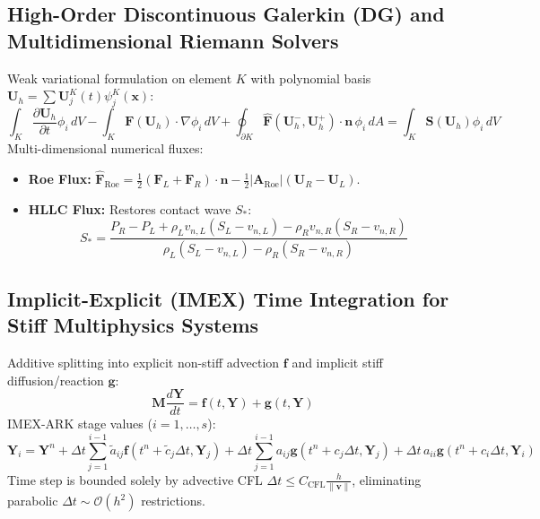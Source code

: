 \documentclass[11pt,a4paper]{article}
\begin{document}
\subsection{High-Order Discontinuous Galerkin (DG) and Multidimensional Riemann Solvers}

Weak variational formulation on element $K$ with polynomial basis $\mathbf{U}_h = \sum \mathbf{U}_j^K(t) \psi_j^K(\mathbf{x})$:
\begin{equation}
\int_K \frac{\partial \mathbf{U}_h}{\partial t} \phi_i \, dV - \int_K \mathbf{F}(\mathbf{U}_h) \cdot \nabla \phi_i \, dV + \oint_{\partial K} \widehat{\mathbf{F}}(\mathbf{U}_h^-, \mathbf{U}_h^+) \cdot \mathbf{n} \, \phi_i \, dA = \int_K \mathbf{S}(\mathbf{U}_h) \phi_i \, dV
\end{equation}
Multi-dimensional numerical fluxes:
\begin{itemize}[leftmargin=*]
    \item \textbf{Roe Flux:} $\widehat{\mathbf{F}}_{\text{Roe}} = \frac{1}{2}(\mathbf{F}_L + \mathbf{F}_R)\cdot\mathbf{n} - \frac{1}{2}|\mathbf{A}_{\text{Roe}}|(\mathbf{U}_R - \mathbf{U}_L)$.
    \item \textbf{HLLC Flux:} Restores contact wave $S_*$:
    \begin{equation}
    S_* = \frac{P_R - P_L + \rho_L v_{n,L}(S_L - v_{n,L}) - \rho_R v_{n,R}(S_R - v_{n,R})}{\rho_L(S_L - v_{n,L}) - \rho_R(S_R - v_{n,R})}
    \end{equation}
\end{itemize}

\subsection{Implicit-Explicit (IMEX) Time Integration for Stiff Multiphysics Systems}

Additive splitting into explicit non-stiff advection $\mathbf{f}$ and implicit stiff diffusion/reaction $\mathbf{g}$:
\begin{equation}
\mathbf{M} \frac{d\mathbf{Y}}{dt} = \mathbf{f}(t, \mathbf{Y}) + \mathbf{g}(t, \mathbf{Y})
\end{equation}
IMEX-ARK stage values ($i = 1, \dots, s$):
\begin{equation}
\mathbf{Y}_i = \mathbf{Y}^n + \Delta t \sum_{j=1}^{i-1} \tilde{a}_{ij} \mathbf{f}(t^n + \tilde{c}_j \Delta t, \mathbf{Y}_j) + \Delta t \sum_{j=1}^{i-1} a_{ij} \mathbf{g}(t^n + c_j \Delta t, \mathbf{Y}_j) + \Delta t \, a_{ii} \mathbf{g}(t^n + c_i \Delta t, \mathbf{Y}_i)
\end{equation}
Time step is bounded solely by advective CFL $\Delta t \le C_{\text{CFL}} \frac{h}{\|\mathbf{v}\|}$, eliminating parabolic $\Delta t \sim \mathcal{O}(h^2)$ restrictions.
\end{document}
